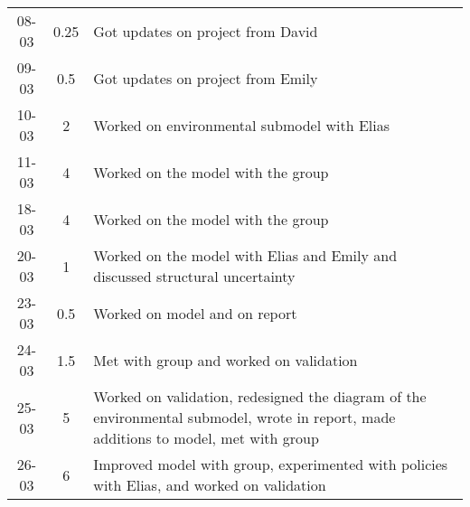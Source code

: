 \begin{longtable}[c]{c|c|m{35em}}
08-03 & 0.25 & Got updates on project from David \\
09-03 & 0.5 & Got updates on project from Emily \\
10-03 & 2 & Worked on environmental submodel with Elias \\
11-03 & 4 & Worked on the model with the group \\
18-03 & 4  & Worked on the model with the group \\
20-03 & 1 & Worked on the model with Elias and Emily and discussed structural uncertainty \\
23-03 & 0.5 & Worked on model and on report \\
24-03 & 1.5 & Met with group and worked on validation \\
25-03 & 5 & Worked on validation, redesigned the diagram of the environmental submodel, wrote in report, made additions to model, met with group \\
26-03 & 6 & Improved model with group, experimented with policies with Elias, and worked on validation 
\end{longtable}


